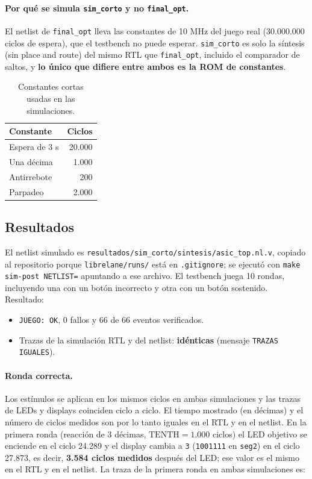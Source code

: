 \documentclass[11pt,letterpaper]{article}
\newcommand{\code}[1]{\texttt{#1}}
\newcommand{\fuente}{\par\vspace{3pt}{\footnotesize\emph{Fuente: Elaboración propia.}}\par}
\begin{document}
\paragraph{Por qué se simula \code{sim\_corto} y no \code{final\_opt}.} El netlist de \code{final\_opt} lleva las constantes de 10 MHz del juego real (30.000.000 ciclos de espera), que el testbench no puede esperar. \code{sim\_corto} es solo la síntesis (sin place and route) del mismo RTL que \code{final\_opt}, incluido el comparador de saltos, y \textbf{lo único que difiere entre ambos es la ROM de constantes}.

\begin{table}[H]
\centering
\caption{Constantes cortas usadas en las simulaciones.}
\label{tab:simconst}
\begin{tabular}{lr}
\toprule
\textbf{Constante} & \textbf{Ciclos}\\
\midrule
Espera de 3 s & 20.000\\
Una décima & 1.000\\
Antirrebote & 200\\
Parpadeo & 2.000\\
\bottomrule
\end{tabular}
\fuente
\end{table}

\subsection{Resultados}

El netlist simulado es \code{resultados/sim\_corto/}\allowbreak\code{sintesis/asic\_top.nl.v}, copiado al repositorio porque \code{librelane/runs/} está en \code{.gitignore}; se ejecutó con \code{make sim-post NETLIST=} apuntando a ese archivo. El testbench juega 10 rondas, incluyendo una con un botón incorrecto y otra con un botón sostenido. Resultado:
\begin{itemize}
  \item \code{JUEGO: OK}, 0 fallos y 66 de 66 eventos verificados.
  \item Trazas de la simulación RTL y del netlist: \textbf{idénticas} (mensaje \code{TRAZAS IGUALES}).
\end{itemize}

\paragraph{Ronda correcta.} Los estímulos se aplican en los mismos ciclos en ambas simulaciones y las trazas de LEDs y displays coinciden ciclo a ciclo. El tiempo mostrado (en décimas) y el número de ciclos medidos son por lo tanto iguales en el RTL y en el netlist. En la primera ronda (reacción de 3 décimas, $\mathrm{TENTH}=1.000$ ciclos) el LED objetivo se enciende en el ciclo 24.289 y el display cambia a \code{3} (\code{1001111} en \code{seg2}) en el ciclo 27.873, es decir, \textbf{3.584 ciclos medidos} después del LED; ese valor es el mismo en el RTL y en el netlist. La traza de la primera ronda en ambas simulaciones es:
\end{document}
